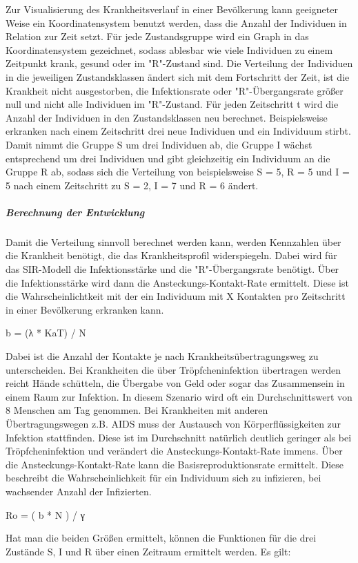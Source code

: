 Zur Visualisierung des Krankheitsverlauf in einer Bevölkerung kann geeigneter Weise ein Koordinatensystem benutzt werden, dass die Anzahl der Individuen in Relation zur Zeit setzt.
Für jede Zustandsgruppe wird ein Graph in das Koordinatensystem gezeichnet, sodass ablesbar wie viele Individuen zu einem Zeitpunkt krank, gesund oder im "R"-Zustand sind.
Die Verteilung der Individuen in die jeweiligen Zustandsklassen ändert sich mit dem Fortschritt der Zeit, ist die Krankheit nicht ausgestorben, die Infektionsrate oder "R"-Übergangsrate größer null und nicht alle Individuen im "R"-Zustand.
Für jeden Zeitschritt t wird die Anzahl der Individuen in den Zustandsklassen neu berechnet.
Beispielsweise erkranken nach einem Zeitschritt drei neue Individuen und ein Individuum stirbt. Damit nimmt die Gruppe S um drei Individuen ab, die Gruppe I wächst entsprechend um drei Individuen und gibt gleichzeitig ein Individuum an die Gruppe R ab, sodass sich die Verteilung von beispielsweise S = 5, R = 5 und I = 5 nach einem Zeitschritt zu S = 2, I = 7 und R = 6 ändert.


\subparagraph{Berechnung der Entwicklung}
Damit die Verteilung sinnvoll berechnet werden kann, werden Kennzahlen über die Krankheit benötigt, die das Krankheitsprofil widerspiegeln. Dabei wird für das SIR-Modell die Infektionsstärke und die "R"-Übergangsrate benötigt.
Über die Infektionsstärke wird dann die Ansteckungs-Kontakt-Rate ermittelt. Diese ist die Wahrscheinlichtkeit mit der ein Individuum mit X Kontakten pro Zeitschritt in einer Bevölkerung erkranken kann.

b = (λ * KaT) / N
 
Dabei ist die Anzahl der Kontakte je nach Krankheitsübertragungsweg zu unterscheiden. Bei Krankheiten die über Tröpfcheninfektion übertragen werden reicht Hände schütteln, die Übergabe von Geld oder sogar das Zusammensein in einem Raum zur Infektion. In diesem Szenario wird oft ein Durchschnittswert von 8 Menschen am Tag genommen. Bei Krankheiten mit anderen Übertragungswegen z.B. AIDS muss der Austausch von Körperflüssigkeiten zur Infektion stattfinden. Diese ist im Durchschnitt natürlich deutlich geringer als bei Tröpfcheninfektion und verändert die Ansteckungs-Kontakt-Rate immens.
Über die Ansteckungs-Kontakt-Rate kann die Basisreproduktionsrate ermittelt. Diese beschreibt die Wahrscheinlichkeit für ein Individuum sich zu infizieren, bei wachsender Anzahl der Infizierten.

Ro = ( b * N ) / γ

Hat man die beiden Größen ermittelt, können die Funktionen für die drei Zustände S, I und R über einen Zeitraum ermittelt werden. 
Es gilt:

